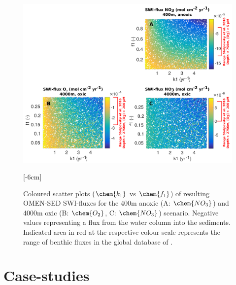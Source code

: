 \documentclass[gmd, manuscript]{copernicus}
\begin{document}
\begin{figure}[htbp]
\begin{center}
	\includegraphics[width=1.0\textwidth]{figures/SA/k1_vs_f1_SWIflux_COMBINED_1604.pdf}
	\caption{Coloured scatter plots ($\chem{k_1}$ vs $\chem{f_1}$) of resulting OMEN-SED SWI-fluxes for the 400m anoxic (A: $\chem{NO_3}$) and 4000m oxic (B: $\chem{O_2}$, C: $\chem{NO_3}$) scenario. 
	Negative values representing a flux from the water column into the sediments.
	Indicated area in red at the respective colour scale represents the range of benthic fluxes in the global database of \citet{bohlen_simple_2012}. 
}\label{fig:SA_Color_ScatterPlots}
[-6cm]%
\end{center}
\end{figure}



% 



\section{Case-studies}
\end{document}
